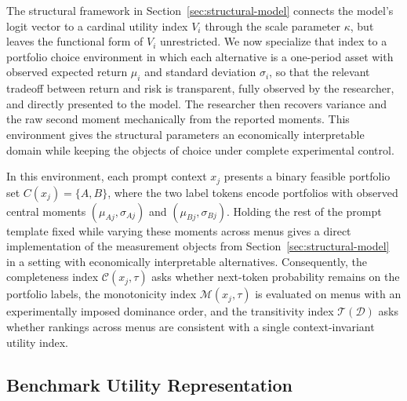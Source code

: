 The structural framework in Section~\ref{sec:structural-model} connects the model's logit vector to a cardinal utility index $V_i$ through the scale parameter $\kappa$, but leaves the functional form of $V_i$ unrestricted. We now specialize that index to a portfolio choice environment in which each alternative is a one-period asset with observed expected return $\mu_i$ and standard deviation $\sigma_i$, so that the relevant tradeoff between return and risk is transparent, fully observed by the researcher, and directly presented to the model. The researcher then recovers variance and the raw second moment mechanically from the reported moments. This environment gives the structural parameters an economically interpretable domain while keeping the objects of choice under complete experimental control.

In this environment, each prompt context $x_j$ presents a binary feasible portfolio set $C(x_j) = \{A,B\}$, where the two label tokens encode portfolios with observed central moments $(\mu_{Aj}, \sigma_{Aj})$ and $(\mu_{Bj}, \sigma_{Bj})$. Holding the rest of the prompt template fixed while varying these moments across menus gives a direct implementation of the measurement objects from Section~\ref{sec:structural-model} in a setting with economically interpretable alternatives. Consequently, the completeness index $\mathcal{C}(x_j,\tau)$ asks whether next-token probability remains on the portfolio labels, the monotonicity index $\mathcal{M}(x_j,\tau)$ is evaluated on menus with an experimentally imposed dominance order, and the transitivity index $\mathcal{T}(\mathcal{D})$ asks whether rankings across menus are consistent with a single context-invariant utility index.


\subsection{Benchmark Utility Representation}

